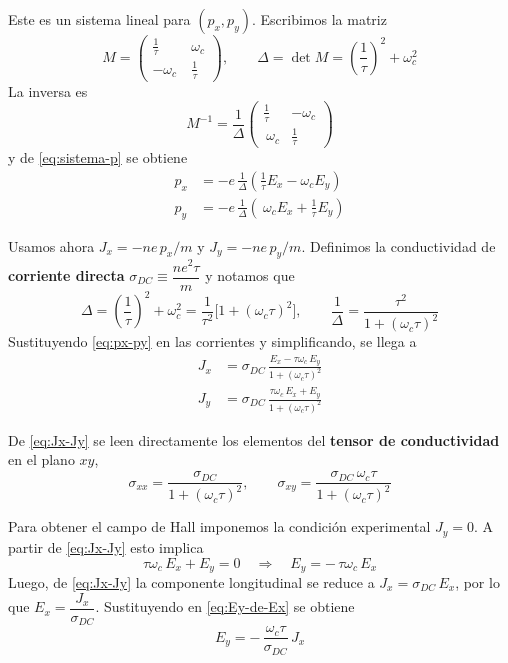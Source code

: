 \documentclass{article}
\begin{document}
Este es un sistema lineal para $(p_x,p_y)$. Escribimos la matriz
\[
M=\begin{pmatrix}
\frac{1}{\tau} & \ \omega_c\\[2pt]
-\omega_c & \ \frac{1}{\tau}
\end{pmatrix},
\qquad
\Delta=\det M=\left(\frac{1}{\tau}\right)^2+\omega_c^2
\]
La inversa es
\[
M^{-1}=\frac{1}{\Delta}\begin{pmatrix}
\frac{1}{\tau} & -\omega_c\\[2pt]
\ \omega_c & \frac{1}{\tau}
\end{pmatrix}
\]
y de \eqref{eq:sistema-p} se obtiene
\begin{equation}\label{eq:px-py}
\begin{aligned}
p_x &= -e\,\frac{1}{\Delta}\!\left(\frac{1}{\tau}E_x-\omega_c E_y\right)\\
p_y &= -e\,\frac{1}{\Delta}\!\left(\ \omega_c E_x+\frac{1}{\tau}E_y\right)
\end{aligned}
\end{equation}

Usamos ahora $J_x=-ne\,p_x/m$ y $J_y=-ne\,p_y/m$. Definimos la conductividad de \textcolor{Cerulean}{\textbf{corriente directa}} $\sigma_{DC}\equiv \dfrac{ne^2\tau}{m}$ y notamos que
\[
\Delta=\left(\frac{1}{\tau}\right)^2+\omega_c^2=\frac{1}{\tau^2}\Big[1+(\omega_c\tau)^2\Big],
\qquad
\frac{1}{\Delta}=\frac{\tau^2}{1+(\omega_c\tau)^2}
\]
Sustituyendo \eqref{eq:px-py} en las corrientes y simplificando, se llega a
\begin{equation}\label{eq:Jx-Jy}
\begin{aligned}
J_x &= \sigma_{DC}\,\frac{E_x-\tau\omega_c\,E_y}{1+(\omega_c\tau)^2}\\
J_y &= \sigma_{DC}\,\frac{\tau\omega_c\,E_x+E_y}{1+(\omega_c\tau)^2}
\end{aligned}
\end{equation}

De \eqref{eq:Jx-Jy} se leen directamente los elementos del \textcolor{Cerulean}{\textbf{tensor de conductividad}} en el plano $xy$,
\begin{equation}\label{eq:tensor-sigma}
\sigma_{xx}=\frac{\sigma_{DC}}{1+(\omega_c\tau)^2},
\qquad
\sigma_{xy}=\frac{\sigma_{DC}\,\omega_c\tau}{1+(\omega_c\tau)^2}
\end{equation}

Para obtener el campo de Hall imponemos la condición experimental $J_y=0$. A partir de \eqref{eq:Jx-Jy} esto implica
\begin{equation}\label{eq:Ey-de-Ex}
\tau\omega_c\,E_x+E_y=0
\quad\Rightarrow\quad
E_y=-\,\tau\omega_c\,E_x
\end{equation}
Luego, de \eqref{eq:Jx-Jy} la componente longitudinal se reduce a $J_x=\sigma_{DC}\,E_x$, por lo que $E_x=\dfrac{J_x}{\sigma_{DC}}$. Sustituyendo en \eqref{eq:Ey-de-Ex} se obtiene
\begin{equation}\label{eq:Ey-de-Jx}
E_y=-\,\frac{\omega_c\tau}{\sigma_{DC}}\,J_x
\end{equation}
\end{document}

